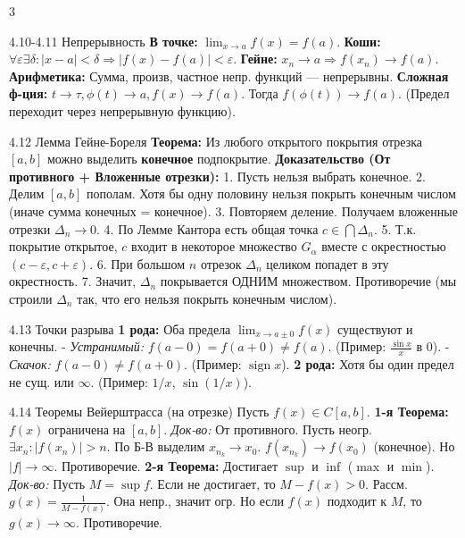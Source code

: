 \documentclass[8pt, a4paper, landscape]{extarticle}
\newcommand{\Ra}{\Rightarrow}
\newcommand{\eps}{\varepsilon}
\DeclareMathOperator{\sign}{sign}
\begin{document}
\begin{multicols*}{3}
\begin{ticket}{4.10-4.11 Непрерывность}
\textbf{В точке:} $\lim_{x\to a} f(x) = f(a)$.
\textbf{Коши:} $\forall \eps \exists \delta: |x-a|<\delta \Ra |f(x)-f(a)|<\eps$.
\textbf{Гейне:} $x_n \to a \Ra f(x_n) \to f(a)$.
\textbf{Арифметика:} Сумма, произв, частное непр. функций — непрерывны.
\textbf{Сложная ф-ция:} $t \to \tau, \phi(t) \to a, f(x) \to f(a)$.
Тогда $f(\phi(t)) \to f(a)$.
(Предел переходит через непрерывную функцию).
\end{ticket}

\begin{ticket}{4.12 Лемма Гейне-Бореля}
\textbf{Теорема:} Из любого открытого покрытия отрезка $[a, b]$ можно выделить \textbf{конечное} подпокрытие.
\tcblower
\textbf{Доказательство (От противного + Вложенные отрезки):}
1. Пусть нельзя выбрать конечное.
2. Делим $[a, b]$ пополам. Хотя бы одну половину нельзя покрыть конечным числом (иначе сумма конечных = конечное).
3. Повторяем деление. Получаем вложенные отрезки $\Delta_n \to 0$.
4. По Лемме Кантора есть общая точка $c \in \bigcap \Delta_n$.
5. Т.к. покрытие открытое, $c$ входит в некоторое множество $G_\alpha$ вместе с окрестностью $(c-\eps, c+\eps)$.
6. При большом $n$ отрезок $\Delta_n$ целиком попадет в эту окрестность.
7. Значит, $\Delta_n$ покрывается ОДНИМ множеством.
Противоречие (мы строили $\Delta_n$ так, что его нельзя покрыть конечным числом).
\end{ticket}

\begin{ticket}{4.13 Точки разрыва}
\textbf{1 рода:} Оба предела $\lim_{x\to a\pm 0} f(x)$ существуют и конечны.
- \textit{Устранимый:} $f(a-0) = f(a+0) \ne f(a)$. (Пример: $\frac{\sin x}{x}$ в 0).
- \textit{Скачок:} $f(a-0) \ne f(a+0)$. (Пример: $\sign x$).
\textbf{2 рода:} Хотя бы один предел не сущ. или $\infty$.
(Пример: $1/x$, $\sin(1/x)$).
\end{ticket}

\begin{ticket}{4.14 Теоремы Вейерштрасса (на отрезке)}
Пусть $f(x) \in C[a, b]$.
\textbf{1-я Теорема:} $f(x)$ ограничена на $[a, b]$.
\textit{Док-во:} От противного. Пусть неогр. $\exists x_n: |f(x_n)| > n$.
По Б-В выделим $x_{n_k} \to x_0$.
$f(x_{n_k}) \to f(x_0)$ (конечное). Но $|f| \to \infty$. Противоречие.
\textbf{2-я Теорема:} Достигает $\sup$ и $\inf$ ($\max$ и $\min$).
\textit{Док-во:} Пусть $M = \sup f$. Если не достигает, то $M - f(x) > 0$.
Рассм. $g(x) = \frac{1}{M-f(x)}$. Она непр., значит огр.
Но если $f(x)$ подходит к $M$, то $g(x) \to \infty$. Противоречие.
\end{ticket}


\end{multicols*}
\end{document}
